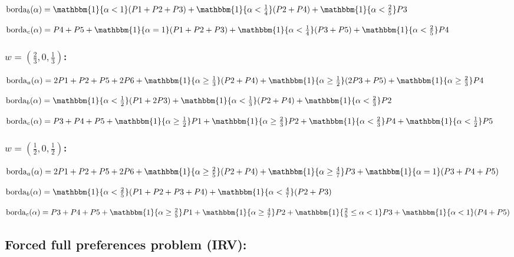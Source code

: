 \documentclass[12pt]{article}
\begin{document}
$\operatorname{borda}_b(\alpha) = \mathbbm{1}\{\alpha < 1\}(P1 + P2 + P3) + \mathbbm{1}\{\alpha < \frac{1}{4}\}(P2 + P4) +  \mathbbm{1}\{\alpha < \frac{2}{5}\}P3$

$\operatorname{borda}_c(\alpha) = P4 + P5 + \mathbbm{1}\{\alpha = 1\}(P1 + P2 + P3) + \mathbbm{1}\{\alpha < \frac{1}{4}\}(P3 + P5) + \mathbbm{1}\{\alpha < \frac{2}{5}\}P4$

\subsubsection*{$w = (\frac{2}{3},0,\frac{1}{3})$:}

$\operatorname{borda}_a(\alpha) = 2P1 + P2 + P5 + 2P6 + \mathbbm{1}\{\alpha \geq \frac{1}{3}\}(P2 + P4) + \mathbbm{1}\{\alpha \geq \frac{1}{2}\}(2P3 + P5) + \mathbbm{1}\{\alpha \geq \frac{2}{3}\}P4$

$\operatorname{borda}_b(\alpha) = \mathbbm{1}\{\alpha < \frac{1}{2}\}(P1 + 2P3) + \mathbbm{1}\{\alpha < \frac{1}{3}\}(P2 + P4) + \mathbbm{1}\{\alpha < \frac{2}{3}\}P2$

$\operatorname{borda}_c(\alpha) = P3 + P4 + P5 + \mathbbm{1}\{\alpha \geq \frac{1}{2}\}P1 + \mathbbm{1}\{\alpha \geq \frac{2}{3}\}P2 + \mathbbm{1}\{\alpha < \frac{2}{3}\}P4 + \mathbbm{1}\{\alpha < \frac{1}{2}\}P5$

\subsubsection*{$w = (\frac{1}{2}, 0, \frac{1}{2})$:}

$\operatorname{borda}_a(\alpha) = 2P1 + P2 + P5 + 2P6 + \mathbbm{1}\{\alpha \geq \frac{2}{5}\}(P2 + P4) + \mathbbm{1}\{\alpha \geq \frac{4}{7}\}P3 + \mathbbm{1}\{\alpha = 1\}(P3 + P4 + P5)$

$\operatorname{borda}_b(\alpha) = \mathbbm{1}\{\alpha < \frac{2}{5}\}(P1 + P2 + P3 + P4) + \mathbbm{1}\{\alpha < \frac{4}{7}\}(P2 + P3)$

$\operatorname{borda}_c(\alpha) = P3 + P4 + P5 + \mathbbm{1}\{\alpha \geq \frac{2}{5}\}P1 + \mathbbm{1}\{\alpha \geq \frac{4}{7}\}P2 + \mathbbm{1}\{\frac{2}{5} \leq \alpha < 1\}P3 + \mathbbm{1}\{\alpha < 1\}(P4 + P5)$

\subsection*{\normalsize Forced full preferences problem (IRV):}
\end{document}
